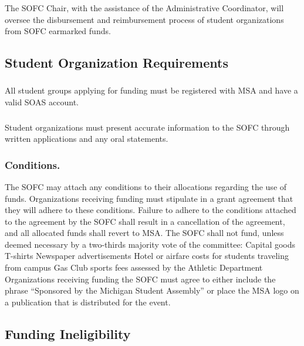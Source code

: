 \subsubsection{}
The SOFC Chair, with the assistance of the Administrative Coordinator, will oversee the disbursement and reimbursement process of student organizations from SOFC earmarked funds.

\subsection{Student Organization Requirements}
\subsubsection{}
All student groups applying for funding must be registered with MSA and have a valid SOAS account.
\subsubsection{}
Student organizations must present accurate information to the SOFC through written applications and any oral statements.
\subsubsection{Conditions.}
\subsubsubsection{}
The SOFC may attach any conditions to their allocations regarding the use of funds.
\subsubsubsection{}
Organizations receiving funding must stipulate in a grant agreement that they will adhere to these conditions.
\subsubsubsection{}
Failure to adhere to the conditions attached to the agreement by the SOFC shall result in a cancellation of the agreement, and all allocated funds shall revert to MSA.
\subsubsubsection{}
The SOFC shall not fund, unless deemed necessary by a two-thirds majority vote of the committee:
\subsubsubsubsection{}
Capital goods
\subsubsubsubsection{}
T-shirts
\subsubsubsubsection{}
Newspaper advertisements
\subsubsubsubsection{}
Hotel or airfare costs for students traveling from campus
\subsubsubsubsection{}
Gas
\subsubsubsubsection{}
Club sports fees assessed by the Athletic Department
\subsubsubsection{}
Organizations receiving funding the SOFC must agree to either include the phrase ``Sponsored by the Michigan Student Assembly'' or place the MSA logo on a publication that is distributed for the event.
 

\subsection{Funding Ineligibility}
